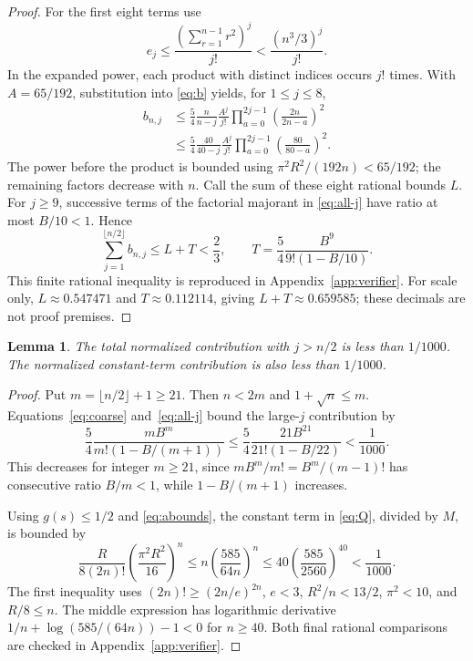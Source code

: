 \documentclass[11pt,letterpaper]{article}
\numberwithin{equation}{section}
\newtheorem{lemma}[theorem]{Lemma}
\begin{document}
\begin{proof}
For the first eight terms use
\[
 e_j\le\frac{(\sum_{r=1}^{n-1}r^2)^j}{j!}<\frac{(n^3/3)^j}{j!}.
\]
In the expanded power, each product with distinct indices occurs $j!$ times. With $A=65/192$, substitution into \eqref{eq:b} yields, for $1\le j\le8$,
\begin{align*}
 b_{n,j}&\le\frac54\frac n{n-j}\frac{A^j}{j!}
 \prod_{a=0}^{2j-1}\left(\frac{2n}{2n-a}\right)^2\\
 &\le\frac54\frac{40}{40-j}\frac{A^j}{j!}
 \prod_{a=0}^{2j-1}\left(\frac{80}{80-a}\right)^2.
\end{align*}
The power before the product is bounded using $\pi^2R^2/(192n)<65/192$; the remaining factors decrease with $n$. Call the sum of these eight rational bounds $L$. For $j\ge9$, successive terms of the factorial majorant in \eqref{eq:all-j} have ratio at most $B/10<1$. Hence
\begin{equation}\label{eq:LT}
 \sum_{j=1}^{\lfloor n/2\rfloor}b_{n,j}\le L+T<\frac23,
 \qquad T=\frac54\frac{B^9}{9!(1-B/10)}.
\end{equation}
This finite rational inequality is reproduced in Appendix~\ref{app:verifier}. For scale only, $L\approx0.547471$ and $T\approx0.112114$, giving $L+T\approx0.659585$; these decimals are not proof premises.
\end{proof}
\begin{lemma}\label{lem:large-j}
The total normalized contribution with $j>n/2$ is less than $1/1000$. The normalized constant-term contribution is also less than $1/1000$.
\end{lemma}
\begin{proof}
Put $m=\lfloor n/2\rfloor+1\ge21$. Then $n<2m$ and $1+\sqrt n\le m$. Equations~\eqref{eq:coarse} and~\eqref{eq:all-j} bound the large-$j$ contribution by
\begin{equation}\label{eq:large-j}
 \frac54\frac{mB^m}{m!(1-B/(m+1))}
 \le\frac54\frac{21B^{21}}{21!(1-B/22)}<\frac1{1000}.
\end{equation}
This decreases for integer $m\ge21$, since $mB^m/m!=B^m/(m-1)!$ has consecutive ratio $B/m<1$, while $1-B/(m+1)$ increases.

Using $g(s)\le1/2$ and \eqref{eq:abounds}, the constant term in \eqref{eq:Q}, divided by $M$, is bounded by
\begin{equation}\label{eq:constant}
 \frac R{8(2n)!}\left(\frac{\pi^2R^2}{16}\right)^n
 \le n\left(\frac{585}{64n}\right)^n
 \le40\left(\frac{585}{2560}\right)^{40}<\frac1{1000}.
\end{equation}
The first inequality uses $(2n)!\ge(2n/e)^{2n}$, $e<3$, $R^2/n<13/2$, $\pi^2<10$, and $R/8\le n$. The middle expression has logarithmic derivative $1/n+\log(585/(64n))-1<0$ for $n\ge40$. Both final rational comparisons are checked in Appendix~\ref{app:verifier}.
\end{proof}
\end{document}
